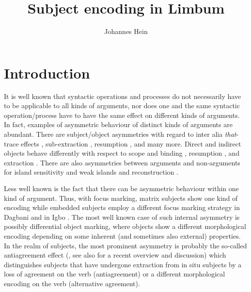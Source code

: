 \documentclass[output=paper]{langscibook}
\author{Johannes Hein\affiliation{University of Potsdam}}
\title{Subject encoding in Limbum}
\begin{document}
\maketitle

\section{Introduction}
\label{sec:johanneshein:intro}

It is well known that syntactic operations and processes do not
necessarily have to be applicable to all kinds of arguments, nor does
one and the same syntactic operation/process have to have the same
effect on different kinds of arguments. In fact, examples of
asymmetric behaviour of distinct kinds of arguments are
abundant. There are subject/object asymmetries with regard to inter
alia \textit{that}-trace effects \citep{perlmutter71}, sub-extraction
\citep{huang82}, resumption \citep{koopman83,mcCloskey90}, and many
more. Direct and indirect objects behave differently with respect to
scope and binding \citep{barss+lasnik86,larson90}, resumption
\citep{stewart01}, and extraction
\citep{bresnan+moshi90,holmbergetal19}. There are also asymmetries
between arguments and non-arguments for island sensitivity and weak
islands \citep{huang82,engdahl86} and reconstruction
\citep{freidin86,lebeaux88}.

Less well known is the fact that there
can be asymmetric behaviour within one kind of argument. Thus, with
focus marking, matrix subjects show one kind of encoding while embedded
subjects employ a different focus marking strategy in Dagbani
\citep{issah+smith18} and in Igbo \citep{amaechi+georgi19}. The most
well known case of such internal asymmetry is possibly differential
object marking, where objects show a different morphological encoding
depending on some inherent (and sometimes also external)
properties. In the realm of subjects, the most prominent asymmetry is
probably the so-called antiagreement effect
(\citealp{ouhalla93,ouhalla05}, see also \citealp{baier18} for a
recent overview and discussion) which distinguishes subjects that have undergone extraction from in situ subjects by a loss of agreement on the verb (antiagreement) or a different
morphological encoding on the verb (alternative agreement).
\end{document}
